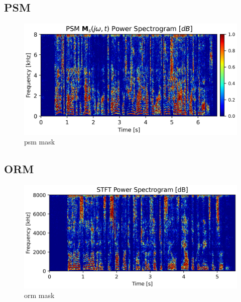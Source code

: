 \subsection{PSM}
\begin{figure}[H]
    \centering
    \includegraphics[width=0.75\linewidth]{Features/images/psm_mask}
    \caption{psm mask}\label{fig:asr_5}
\end{figure}

\subsection{ORM}
\begin{figure}[H]
    \centering
    \includegraphics[width=0.75\linewidth]{Features/images/orm_mask}
    \caption{orm mask}\label{fig:asr_5}
\end{figure}


